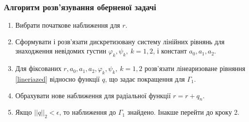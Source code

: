 \documentclass[10pt]{beamer}
\begin{document}
\begin{frame}
\frametitle{Алгоритм розв'язування оберненої задачі}

\begin{enumerate}
  \item Вибрати початкове наближення для $r$.
  \item Сформувати і розв'язати дискретизовану систему лінійних рівнянь для знаходження невідомих густин $\varphi_k,\psi_k, \ k=1,2$, і констант $a_0,a_1, a_2$.
  \item Для фіксованих $r, a_0,a_1, a_2, \varphi_k,\psi_k, \ k=1,2$ розв'язати лінеаризоване рівняння \eqref{lineriazed} відносно функції $q$, що задає покращення для $\Gamma_1$.
  \item Обрахувати нове наближення для радіальної функції $r=r+q_n$.
  \item Якщо $||q||_2<\epsilon$, то наближення до $\Gamma_1$ знайдено. Інакше перейти до кроку 2.
\end{enumerate}
 
\end{frame}

\end{document}
